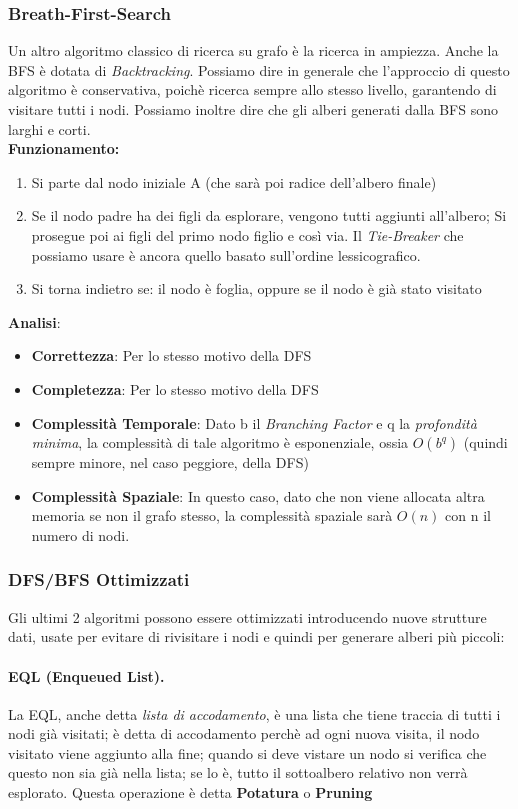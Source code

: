 \subsubsection{Breath-First-Search}
Un altro algoritmo classico di ricerca su grafo è la ricerca in ampiezza. Anche la BFS è dotata di \textit{Backtracking}. Possiamo 
dire in generale che l'approccio di questo algoritmo è conservativa, poichè ricerca sempre allo stesso livello, garantendo di visitare tutti i nodi.
Possiamo inoltre dire che gli alberi generati dalla BFS sono larghi e corti.\\
\smallskip
\textbf{Funzionamento:}
\begin{enumerate}
    \item Si parte dal nodo iniziale A (che sarà poi radice dell'albero finale)
    \item Se il nodo padre ha dei figli da esplorare, vengono tutti aggiunti all'albero; Si prosegue poi ai figli del primo nodo figlio e così via.
    Il \textit{Tie-Breaker} che possiamo usare è ancora quello basato sull'ordine lessicografico.
    \item Si torna indietro se: il nodo è foglia, oppure se il nodo è già stato visitato
\end{enumerate}

\textbf{Analisi}:
\begin{itemize}
    \item \textbf{Correttezza}: Per lo stesso motivo della DFS
    \item \textbf{Completezza}: Per lo stesso motivo della DFS
    \item \textbf{Complessità Temporale}: Dato b il \textit{Branching Factor} e q la \textit{profondità minima}, la complessità di tale algoritmo è esponenziale, ossia $O(b^q)$ (quindi sempre minore, nel caso peggiore, della DFS)
    \item \textbf{Complessità Spaziale}: In questo caso, dato che non viene allocata altra memoria se non il grafo stesso, la complessità spaziale sarà $O(n)$ con n il numero di nodi. 
\end{itemize}
\subsubsection{DFS/BFS Ottimizzati}
Gli ultimi 2 algoritmi possono essere ottimizzati introducendo nuove strutture dati, usate per evitare di rivisitare 
i nodi e quindi per generare alberi più piccoli:

\paragraph{EQL (Enqueued List).}
La EQL, anche detta \textit{lista di accodamento}, è una lista che tiene traccia di tutti i nodi già visitati; è detta
di accodamento perchè ad ogni nuova visita, il nodo visitato viene aggiunto alla fine; quando si deve vistare un nodo
si verifica che questo non sia già nella lista; se lo è, tutto il sottoalbero relativo non verrà esplorato. Questa 
operazione è detta \textbf{Potatura} o \textbf{Pruning}

